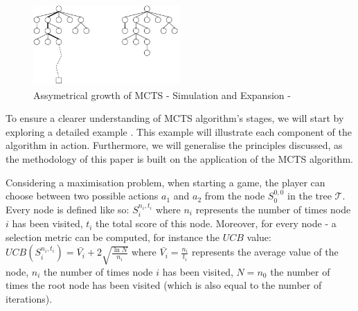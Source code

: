 \documentclass[conference]{IEEEtran}
\begin{document}
\begin{figure}
    \centering
    \includegraphics[width=0.5\textwidth]{Figures/assymetric_growth_mcts_tree.png}
    \caption{Assymetrical growth of MCTS - Simulation and Expansion - \cite{mcts_assymetrical_growth}}
    \label{fig:Assymetrical_growth_MCTS}
\end{figure}


To ensure a clearer understanding of MCTS algorithm's stages, we will start by exploring a detailed example \cite{example_youtube_mcts}. This example will illustrate each component of the algorithm in action. Furthermore, we will generalise the principles discussed, as the methodology of this paper is built on the application of the MCTS algorithm.

Considering a maximisation problem, when starting a game, the player can choose between two possible actions $a_1$ and $a_2$ from the node $S^{0,0}_0$ in the tree $\mathcal{T}$. 
Every node is defined like so: $S^{n_i,t_i}_i$ where $n_i$ represents the number of times node $i$ has been visited, $t_i$ the total score of this node.
Moreover, for every node - a selection metric can be computed, for instance the $UCB$ value: $UCB(S^{n_i,t_i}_i)=\bar{V_i} + 2 \sqrt{\frac{\ln N}{n_i}}$ where $\bar{V_i}=\frac{n_i}{t_i}$ represents the average value of the node, $n_i$ the number of times node $i$ has been visited, $N=n_0$ the number of times the root node has been visited (which is also equal to the number of iterations).
\end{document}
